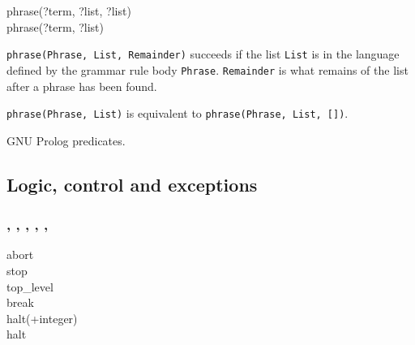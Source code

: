 \begin{TemplatesOneCol}
phrase(?term, ?list, ?list)\\
phrase(?term, ?list)

\end{TemplatesOneCol}

\Description

\texttt{phrase(Phrase, List, Remainder)} succeeds if the list
\texttt{List} is in the language defined by the grammar rule body
\texttt{Phrase}. \texttt{Remainder} is what remains of the list after a
phrase has been found.

\texttt{phrase(Phrase, List)} is equivalent to
\texttt{phrase(Phrase, List, [])}.

\begin{PlErrors}





\end{PlErrors}

\Portability

GNU Prolog predicates.

\subsection{Logic, control and exceptions}

\subsubsection{,\label{abort/0}
               ,
               ,
               ,
               ,
               }


\begin{TemplatesOneCol}
abort\\
stop\\
top\_level\\
break\\
halt(+integer)\\
halt

\end{TemplatesOneCol}

